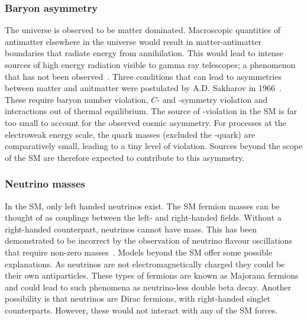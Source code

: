 \subsubsection{Baryon asymmetry} 

The universe is observed to be matter dominated. Macroscopic quantities of antimatter elsewhere in the universe would result in matter-antimatter boundaries that radiate energy from annihilation. This would lead to intense sources of high energy radiation visible to gamma ray telescopes; a phenomenon that has not been observed~\cite{vonBallmoos2014}. 
Three conditions that can lead to asymmetries between matter and anitmatter were postulated by A.D. Sakharov in 1966~\cite{Sakharov:1967dj}. These require baryon number violation, $C$- and \CP-symmetry violation and interactions out of thermal equilibrium. The source of \CP-violation in the SM is far too small to account for the observed cosmic asymmetry. For processes at the electroweak energy scale, the quark masses (excluded the \tquark-quark) are comparatively small, leading to a tiny level of \CP violation. Sources beyond the scope of the SM are therefore expected to contribute to this asymmetry. 



\subsubsection{Neutrino masses} 
In the SM, only left handed neutrinos exist.  The SM fermion masses can be thought of as couplings between the left- and right-handed fields. Without a right-handed counterpart, neutrinos cannot have mass. This has been demonstrated to be incorrect by the observation of neutrino flavour oscillations that require non-zero masses~\cite{PhysRevLett.81.1158,PhysRevLett.87.071301}. 
Models beyond the SM offer some possible explanations. As neutrinos are not electromagnetically charged they could be their own antiparticles. These types of fermions are known as Majorana fermions~\cite{Majorana:1937vz} and could lead to such phenomena as neutrino-less double beta decay. 
Another possibility is that neutrinos are Dirac fermions, with right-handed singlet counterparts. However, these would not interact with any of the SM forces.


